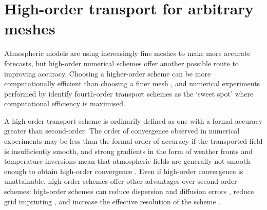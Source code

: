 \chapter{High-order transport for arbitrary meshes}
\label{ch:highOrder}


Atmospheric models are using increasingly fine meshes to make more accurate forecasts, but high-order numerical schemes offer another possible route to improving accuracy.
Choosing a higher-order scheme can be more computationally efficient than choosing a finer mesh \citep{waruszewski2018}, and numerical experiments performed by \citet{ullrich2014} identify fourth-order transport schemes as the `sweet spot'  where computational efficiency is maximised.

A high-order transport scheme is ordinarily defined as one with a formal accuracy greater than second-order.
The order of convergence observed in numerical experiments may be less than the formal order of accuracy if the transported field is insufficiently smooth, and strong gradients in the form of weather fronts and temperature inversions mean that atmospheric fields are generally not smooth enough to obtain high-order convergence \citep{holdaway2008}. 
Even if high-order convergence is unattainable, high-order schemes offer other advantages over second-order schemes: high-order schemes can reduce dispersion and diffusion errors \citep{ullrich-jablonowski2012,waruszewski2018}, reduce grid imprinting \citep{mccorquodale2015}, and increase the effective resolution of the scheme \citep{ullrich2014}.

